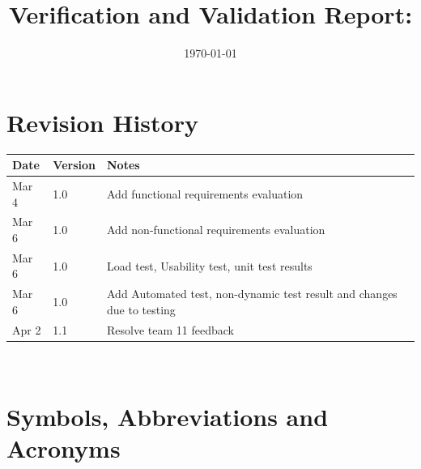 \documentclass[12pt, titlepage]{article}
\begin{document}
\title{Verification and Validation Report: \progname} 
\author{\authname}
\date{\today}
	
\maketitle


\section{Revision History}

\begin{tabularx}{\textwidth}{p{3cm}p{2cm}X}
\toprule {\bf Date} & {\bf Version} & {\bf Notes}\\
\midrule
Mar 4 & 1.0 & Add functional requirements evaluation\\
Mar 6 & 1.0 & Add non-functional requirements evaluation\\
Mar 6 & 1.0 & Load test, Usability test, unit test results\\
Mar 6 & 1.0 & Add Automated test, non-dynamic test result and changes due to testing\\
Apr 2 & 1.1 & Resolve team 11 feedback\\
\bottomrule
\end{tabularx}

~\newpage

\section{Symbols, Abbreviations and Acronyms}
\end{document}
